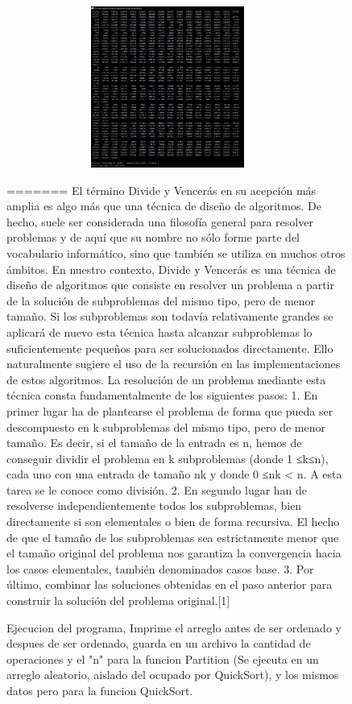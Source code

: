 \documentclass[spanish]{article}
\begin{document}
	\begin{figure}[h!]
		\centering
		\includegraphics[width=400px,height=200px]{ejecucionPrimeraParte}
		\caption{Ejecucion del programa, Imprime el arreglo antes de ser ordenado y despues de ser ordenado, guarda en un archivo la cantidad de operaciones y el "n" para la funcion Partition (Se ejecuta en un arreglo aleatorio, aislado del ocupado por QuickSort), y los mismos datos pero para la funcion QuickSort.}
=======
	El  término  Divide  y  Vencerás  en  su  acepción  más  amplia  es  algo  más  que  una  técnica  de  diseño  de  algoritmos.  De  hecho,  suele  ser  considerada  una  filosofía  general  para  resolver  problemas  y  de  aquí  que  su  nombre  no  sólo  forme  parte  del  vocabulario informático, sino que también se utiliza en muchos otros ámbitos.      En nuestro contexto, Divide y Vencerás es una técnica de diseño de algoritmos que  consiste  en  resolver  un  problema  a  partir  de  la  solución  de  subproblemas  del  mismo tipo, pero de menor tamaño. Si los subproblemas son todavía relativamente grandes   se   aplicará   de   nuevo   esta   técnica   hasta   alcanzar   subproblemas   lo   suficientemente  pequeños  para  ser  solucionados  directamente.  Ello  naturalmente  sugiere el uso de la recursión en las implementaciones de estos algoritmos.       La  resolución  de  un  problema  mediante  esta  técnica  consta  fundamentalmente  de los siguientes pasos: 1.   En   primer   lugar   ha   de   plantearse   el   problema   de   forma   que   pueda   ser   descompuesto  en  k  subproblemas  del  mismo  tipo,  pero  de  menor  tamaño.  Es  decir, si el tamaño de la entrada es n, hemos de conseguir dividir el problema en k  subproblemas  (donde  1  ≤k≤n),  cada  uno  con  una  entrada  de  tamaño  nk  y  donde 0 ≤nk < n. A esta tarea se le conoce como división. 2.    En    segundo    lugar    han    de    resolverse    independientemente    todos    los    subproblemas,  bien  directamente  si  son  elementales  o  bien  de  forma  recursiva.  El hecho de que el tamaño de los subproblemas sea estrictamente menor que el tamaño  original  del  problema  nos  garantiza  la  convergencia  hacia  los  casos  elementales, también denominados casos base. 3.  Por  último,  combinar las soluciones obtenidas en el paso anterior para construir la solución del problema original.[1]	

\end{figure}
\end{document}

